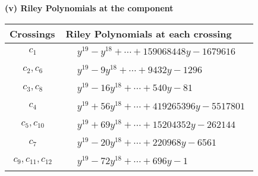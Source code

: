 \documentclass[1p]{elsarticle_modified}
\theoremstyle{definition}
\begin{document}
\flushleft \textbf{(v) Riley Polynomials at the component}\newline \\
\begin{tabular}{m{50pt}|m{274pt}}
Crossings & \hspace{64pt}Riley Polynomials at each crossing \\
\hline $$\begin{aligned}c_{1}\end{aligned}$$&$\begin{aligned}
&y^{19}- y^{18}+\cdots+159068448 y-1679616
\end{aligned}$\\
\hline $$\begin{aligned}c_{2},c_{6}\end{aligned}$$&$\begin{aligned}
&y^{19}-9 y^{18}+\cdots+9432 y-1296
\end{aligned}$\\
\hline $$\begin{aligned}c_{3},c_{8}\end{aligned}$$&$\begin{aligned}
&y^{19}-16 y^{18}+\cdots+540 y-81
\end{aligned}$\\
\hline $$\begin{aligned}c_{4}\end{aligned}$$&$\begin{aligned}
&y^{19}+56 y^{18}+\cdots+419265396 y-5517801
\end{aligned}$\\
\hline $$\begin{aligned}c_{5},c_{10}\end{aligned}$$&$\begin{aligned}
&y^{19}+69 y^{18}+\cdots+15204352 y-262144
\end{aligned}$\\
\hline $$\begin{aligned}c_{7}\end{aligned}$$&$\begin{aligned}
&y^{19}-20 y^{18}+\cdots+220968 y-6561
\end{aligned}$\\
\hline $$\begin{aligned}c_{9},c_{11},c_{12}\end{aligned}$$&$\begin{aligned}
&y^{19}-72 y^{18}+\cdots+696 y-1
\end{aligned}$\\
\hline
\end{tabular}\\~\\
\end{document}
